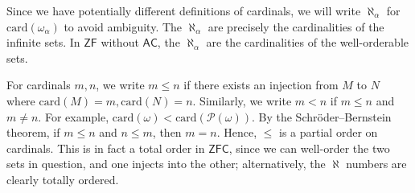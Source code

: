 Since we have potentially different definitions of cardinals, we will write \( \aleph_\alpha \) for \( \mathrm{card}(\omega_\alpha) \) to avoid ambiguity.
The \( \aleph_\alpha \) are precisely the cardinalities of the infinite sets.
In \( \mathsf{ZF} \) without \( \mathsf{AC} \), the \( \aleph_\alpha \) are the cardinalities of the well-orderable sets.

For cardinals \( m, n \), we write \( m \leq n \) if there exists an injection from \( M \) to \( N \) where \( \mathrm{card}(M) = m, \mathrm{card}(N) = n \).
Similarly, we write \( m < n \) if \( m \leq n \) and \( m \neq n \).
For example, \( \mathrm{card}(\omega) < \mathrm{card}(\mathcal P(\omega)) \).
By the Schr\"oder--Bernstein theorem, if \( m \leq n \) and \( n \leq m \), then \( m = n \).
Hence, \( \leq \) is a partial order on cardinals.
This is in fact a total order in \( \mathsf{ZFC} \), since we can well-order the two sets in question, and one injects into the other; alternatively, the \( \aleph \) numbers are clearly totally ordered.

